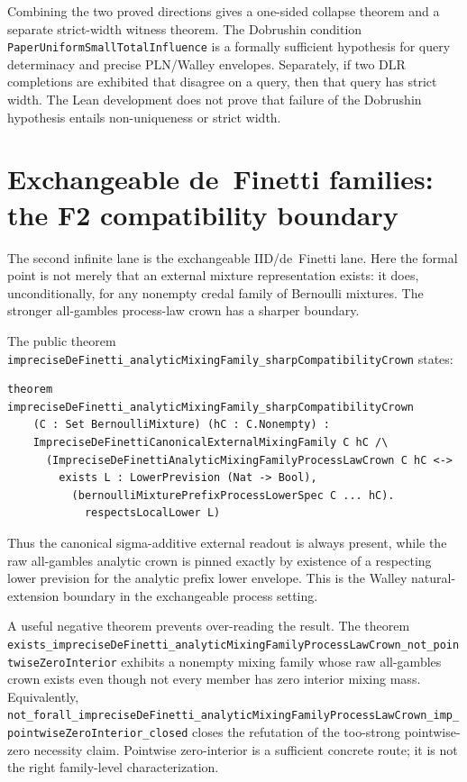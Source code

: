\documentclass[]{article}
\newcommand{\lid}[1]{{\ttfamily\nolinkurl{#1}}}
\begin{document}
Combining the two proved directions gives a one-sided collapse theorem
and a separate strict-width witness theorem. The Dobrushin condition
\lid{PaperUniformSmallTotalInfluence} is a formally sufficient hypothesis
for query determinacy and precise PLN/Walley envelopes. Separately, if
two DLR completions are exhibited that disagree on a query, then that
query has strict width. The Lean development does not prove that failure
of the Dobrushin hypothesis entails non-uniqueness or strict width.

\section{Exchangeable de~Finetti families: the F2 compatibility boundary}\label{sec:definetti-f2}

The second infinite lane is the exchangeable IID/de~Finetti lane. Here the
formal point is not merely that an external mixture representation exists:
it does, unconditionally, for any nonempty credal family of Bernoulli
mixtures. The stronger all-gambles process-law crown has a sharper
boundary.

The public theorem
\lid{impreciseDeFinetti\_analyticMixingFamily\_sharpCompatibilityCrown}
states:
\begin{lstlisting}
theorem impreciseDeFinetti_analyticMixingFamily_sharpCompatibilityCrown
    (C : Set BernoulliMixture) (hC : C.Nonempty) :
    ImpreciseDeFinettiCanonicalExternalMixingFamily C hC /\
      (ImpreciseDeFinettiAnalyticMixingFamilyProcessLawCrown C hC <->
        exists L : LowerPrevision (Nat -> Bool),
          (bernoulliMixturePrefixProcessLowerSpec C ... hC).
            respectsLocalLower L)
\end{lstlisting}
Thus the canonical sigma-additive external readout is always present, while
the raw all-gambles analytic crown is pinned exactly by existence of a
respecting lower prevision for the analytic prefix lower envelope. This is
the Walley natural-extension boundary in the exchangeable process setting.

A useful negative theorem prevents over-reading the result. The theorem
\lid{exists\_impreciseDeFinetti\_analyticMixingFamilyProcessLawCrown\_not\_pointwiseZeroInterior}
exhibits a nonempty mixing family whose raw all-gambles crown exists even
though not every member has zero interior mixing mass. Equivalently,
\lid{not\_forall\_impreciseDeFinetti\_analyticMixingFamilyProcessLawCrown\_imp\_pointwiseZeroInterior\_closed}
closes the refutation of the too-strong pointwise-zero necessity claim.
Pointwise zero-interior is a sufficient concrete route; it is not the
right family-level characterization.
\end{document}
